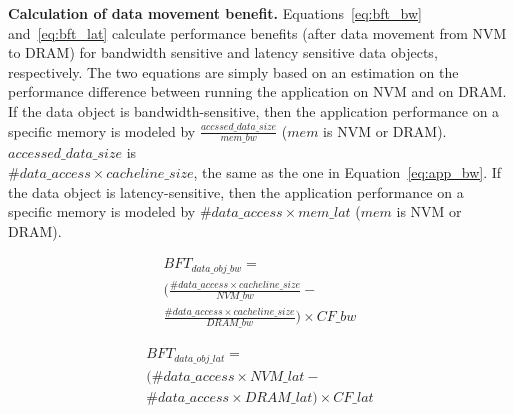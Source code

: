 \textbf{Calculation of data movement benefit.}
Equations~\ref{eq:bft_bw} and~\ref{eq:bft_lat} calculate performance benefits (after data movement from NVM to DRAM) for bandwidth sensitive and latency sensitive data objects, respectively. 
The two equations are simply based on an estimation on the performance difference between running the application on NVM and on DRAM.
If the data object is bandwidth-sensitive, then
the application performance on a specific memory is
modeled by $\frac{accssed\_data\_size}{mem\_bw}$ ($mem$ is NVM or DRAM).
$accessed\_data\_size$ is \\ $\#data\_access \times cacheline\_size$,
the same as the one in Equation~\ref{eq:app_bw}. 
If the data object is latency-sensitive, then the application
performance on a specific memory is modeled by ${\#data\_access \times mem\_lat}$ ($mem$ is NVM or DRAM). %
\begin{comment}
In Step 1, we use a sampling-based approach to collect performance events.
This means that we periodically examine the last cache miss. Hence, in the two equations, $\#data\_access$ is weighted by 
$\#samples$ 
the total number of samples in a 

($\#data\_access \times \#samples$).
$\#samples$ is calculated by $phase\_execution\_time$ divided by $sampling\_interval$.
$phase\_\\execution\_time$ is measured in the profiling iteration.
\end{comment}

\scriptsize
\begin{multline}
\label{eq:bft_bw}
    BFT_{data\_obj\_bw} = \\ (\frac{\#data\_access \times cacheline\_size}{NVM\_bw} - \\ 
     \frac{\#data\_access \times cacheline\_size}{DRAM\_bw}) \times CF\_bw
\end{multline}

\begin{multline}
\label{eq:bft_lat}
    BFT_{data\_obj\_lat} = \\ (\#data\_access \times NVM\_lat - \\ 
     \#data\_access \times DRAM\_lat) \times CF\_lat
\end{multline}
\normalsize

